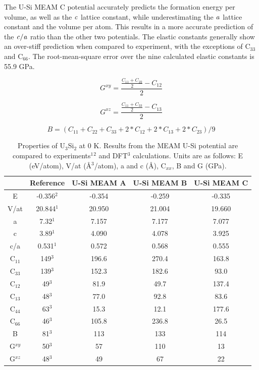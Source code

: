 \documentclass[review]{elsarticle}
\begin{document}
The U-Si MEAM C potential accurately predicts the formation energy per volume, as well as the $\it{c}$ lattice constant, while underestimating the $\it{a}$ lattice constant and the volume per atom.  This results in a more accurate prediction of the $\it{c/a}$ ratio than the other two potentials.  The elastic constants generally show an over-stiff prediction when compared to experiment, with the exceptions of C$_{33}$ and C$_{66}$.  The root-mean-square error over the nine calculated elastic constants is 55.9 GPa.  

\begin{equation}
\label{eq:gxy}
G^{xy}= \frac{\frac{C_{11} + C_{22}}{2} - C_{12}}{2}
\end{equation}

\begin{equation}
\label{eq:gxz}
G^{xz}= \frac{\frac{C_{11} + C_{33}}{2} - C_{13}}{2}
\end{equation}

\begin{equation}
\label{eq:bulk}
B=(C_{11} + C_{22} + C_{33} + 2*C_{12} + 2*C_{13} + 2*C_{23})/9
\end{equation}

\begin{table}[h!]
\caption{Properties of U$_{3}$Si$_{2}$ at 0 K.  Results from the MEAM U-Si potential are compared to experiments$^{1}$\cite{zachariasen1949}$^{2}$\cite{berche2009} and DFT$^{3}$\cite{noordhoek2016} calculations.  Units are as follows: E (eV/atom), V/at (\AA$^{3}$/atom), a and c (\AA), C$_{xx}$, B and G (GPa). }\label{tab:ben5}
\begin{center}
\begin{tabular}{|c|c|c|c|c|}
     \hline
      & Reference & U-Si MEAM A & U-Si MEAM B & U-Si MEAM C \\
     \hline
     E & -0.356$^{2}$ & -0.354 & -0.259 & -0.335\\
     V/at & 20.844$^{1}$ & 20.950 & 21.004 & 19.660\\
     a & 7.32$^{1}$ & 7.157 & 7.177 & 7.077\\
     c & 3.89$^{1}$ & 4.090 & 4.078 & 3.925\\
     c/a & 0.531$^{1}$ & 0.572 & 0.568 & 0.555\\
     C$_{11}$ & 149$^{3}$ & 196.6 & 270.4 & 163.8 \\
     C$_{33}$ & 139$^{3}$ & 152.3 & 182.6 & 93.0\\
     C$_{12}$ & 49$^{3}$ & 81.9 & 49.7 & 137.4\\
     C$_{13}$ & 48$^{3}$ & 77.0 & 92.8 & 83.6\\
     C$_{44}$ & 63$^{3}$ & 15.3 & 12.1 & 177.6\\
     C$_{66}$ & 46$^{3}$ & 105.8 & 236.8 & 26.5\\
     B & 81$^{3}$ & 113 & 133 & 114\\
     G$^{xy}$ & 50$^{3}$ & 57 & 110 & 13  \\
     G$^{xz}$ & 48$^{3}$ & 49 & 67 & 22\\
     \hline
\end{tabular}
\end{center}
\label{default}
\end{table}%
\end{document}
